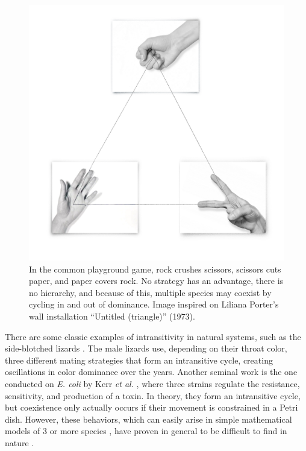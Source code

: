 \begin{figure}[t]
     \centering
\includegraphics[width=0.7\columnwidth]{figures/methods/fig_RPS.pdf}
 \caption[Intransitivity diagram]{In the common playground game, rock crushes scissors, scissors cuts paper, and paper covers rock. No strategy has an advantage, there is no hierarchy, and because of this, multiple species may coexist by cycling in and out of dominance. Image inspired on Liliana Porter's wall installation ``Untitled (triangle)'' (1973).}
\label{chp:methods:fig:RPS}
\end{figure}

 There are some classic examples of intransitivity in natural systems, such as the side-blotched lizards \cite{sinervo1996rock}. The male lizards use, depending on their throat color, three different mating strategies that form an intransitive cycle, creating oscillations in color dominance over the years. Another seminal work is the one conducted on \textit{E. coli} by Kerr \textit{et al.} \cite{kerr2002local}, where three strains regulate the resistance, sensitivity, and production of a toxin. In theory, they form an intransitive cycle, but coexistence only actually occurs if their movement is constrained in a Petri dish. However, these behaviors, which can easily arise in simple mathematical models of $3$ or more species \cite{may1975nonlinear}, have proven in general to be difficult to find in nature \cite{godoy2017intransitivity, friedman2017community}.\\

